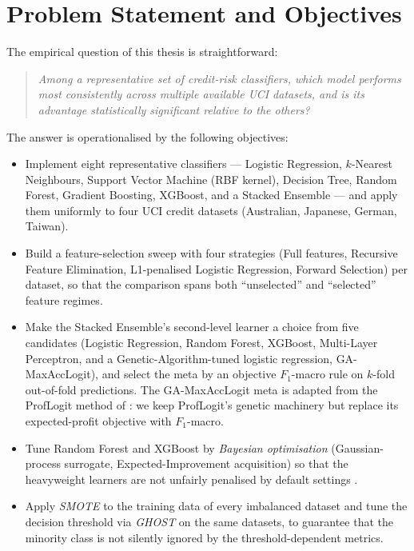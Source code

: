 \section{Problem Statement and Objectives}
\label{sec:problem}

The empirical question of this thesis is straightforward:
\begin{quote}
\emph{Among a representative set of credit-risk classifiers, which
model performs most consistently across multiple available UCI
datasets, and is its advantage statistically significant relative to
the others?}
\end{quote}
The answer is operationalised by the following objectives:

\begin{itemize}
 \item[\textbf{1.}] Implement eight representative classifiers ---
 Logistic Regression, $k$-Nearest Neighbours, Support Vector Machine
 (RBF kernel), Decision Tree, Random Forest, Gradient Boosting,
 XGBoost, and a Stacked Ensemble --- and apply them uniformly to
 four UCI credit datasets (Australian, Japanese, German, Taiwan).
 \item[\textbf{2.}] Build a feature-selection sweep with four
 strategies (Full features, Recursive Feature Elimination,
 L1-penalised Logistic Regression, Forward Selection) per dataset,
 so that the comparison spans both ``unselected'' and ``selected''
 feature regimes.
 \item[\textbf{3.}] Make the Stacked Ensemble's second-level learner
 a choice from five candidates (Logistic Regression, Random Forest,
 XGBoost, Multi-Layer Perceptron, and a Genetic-Algorithm-tuned
 logistic regression, GA-MaxAccLogit), and select the meta by an
 objective $F_1$-macro rule on $k$-fold out-of-fold predictions.
 The GA-MaxAccLogit meta is adapted from the ProfLogit method of
 \citet{stripling2018proflogit}: we keep ProfLogit's genetic
 machinery but replace its expected-profit objective with $F_1$-macro.
 \item[\textbf{4.}] Tune Random Forest and XGBoost by \emph{Bayesian
 optimisation} (Gaussian-process surrogate, Expected-Improvement
 acquisition) so that the heavyweight learners are not unfairly
 penalised by default settings \citep{snoek2012practical}.
 \item[\textbf{5.}] Apply \emph{SMOTE} to the training data of every
 imbalanced dataset and tune the decision threshold via \emph{GHOST}
 on the same datasets, to guarantee that the minority class is not
 silently ignored by the threshold-dependent metrics.

\end{itemize}
